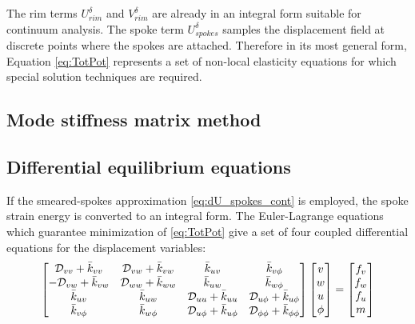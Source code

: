 \documentclass[\rootdir/thesis.tex]{subfiles}
\begin{document}
The rim terms $U_{rim}^{\delta}$ and $V_{rim}^{\delta}$ are already in an integral form suitable for continuum analysis. The spoke term $U_{spokes}^{\delta}$ samples the displacement field at discrete points where the spokes are attached. Therefore in its most general form, Equation \eqref{eq:TotPot} represents a set of non-local elasticity equations for which special solution techniques are required.

\subsection{Mode stiffness matrix method}
\label{sec:ModeMatrix}


\subsection{Differential equilibrium equations}

If the smeared-spokes approximation \eqref{eq:dU_spokes_cont} is employed, the spoke strain energy is converted to an integral form. The Euler-Lagrange equations which guarantee minimization of \eqref{eq:TotPot} give a set of four coupled differential equations for the displacement variables:
\begin{equation}
\label{eq:EulerLagrange}
\begin{bmatrix}
 \mathcal{D}_{vv} + \bar{k}_{vv} & \mathcal{D}_{vw} + \bar{k}_{vw} & \bar{k}_{uv}              & \bar{k}_{v\phi}\\
-\mathcal{D}_{vw} + \bar{k}_{vw} & \mathcal{D}_{ww} + \bar{k}_{ww} & \bar{k}_{uw}              & \bar{k}_{w\phi}\\
\bar{k}_{uv}            & \bar{k}_{uw}           & \mathcal{D}_{uu} + \bar{k}_{uu}    & \mathcal{D}_{u\phi} + \bar{k}_{u\phi}\\
\bar{k}_{v\phi}            & \bar{k}_{w\phi}           & \mathcal{D}_{u\phi} + \bar{k}_{u\phi} & \mathcal{D}_{\phi\phi} + \bar{k}_{\phi\phi}
\end{bmatrix}
\begin{bmatrix}
v\\w\\u\\\phi
\end{bmatrix}=
\begin{bmatrix}
f_v\\f_w\\f_u\\m
\end{bmatrix}
\end{equation}
\end{document}
